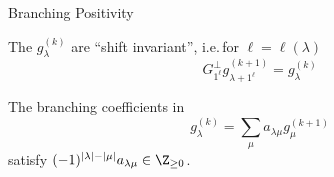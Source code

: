 \documentclass{beamer}
\DeclareMathOperator{\Gr}{Gr}
\newcommand{\G}{\mathfrak{G}}
\begin{document}
\begin{frame}{Branching Positivity}
  \begin{theorem}
    \pause
    The \(g_\lambda^{(k)}\) are ``shift
        invariant'', i.e.\,for \(\ell = \ell(\lambda)\)
      \[
        G_{1^\ell}^\perp g_{\lambda+1^\ell}^{(k+1)} = g_\lambda^{(k)}
      \]
  \end{theorem}\pause
  \begin{theorem}
    The branching coefficients in 
    \[
      g_\lambda^{(k)} = \sum_\mu a_{\lambda \mu} g_\mu^{(k+1)}
    \]
    satisfy \((-1)^{|\lambda|-|\mu|}a_{\lambda \mu} \in \Z_{\geq 0}\).
  \end{theorem}
\end{frame}
\end{document}
